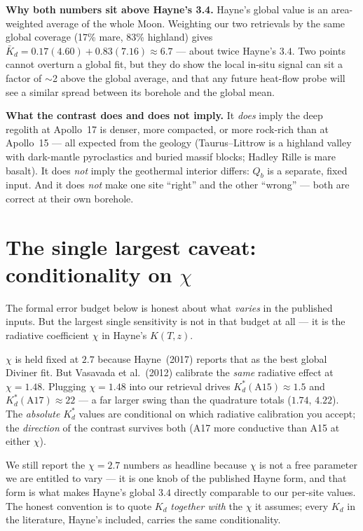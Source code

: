 \documentclass[11pt]{report}
\begin{document}
\noindent\textbf{Why both numbers sit above Hayne's 3.4.} Hayne's global value is
an area-weighted average of the whole Moon. Weighting our two retrievals by the
same global coverage (17\% mare, 83\% highland) gives
$\bar K_d=0.17(4.60)+0.83(7.16)\approx6.7$ --- about twice Hayne's $3.4$. Two
points cannot overturn a global fit, but they do show the local in-situ signal
can sit a factor of $\sim$2 above the global average, and that any future
heat-flow probe will see a similar spread between its borehole and the global
mean.

\noindent\textbf{What the contrast does and does not imply.} It \emph{does} imply
the deep regolith at Apollo~17 is denser, more compacted, or more rock-rich than
at Apollo~15 --- all expected from the geology (Taurus--Littrow is a highland
valley with dark-mantle pyroclastics and buried massif blocks; Hadley Rille is
mare basalt). It does \emph{not} imply the geothermal interior differs: $Q_b$ is
a separate, fixed input. And it does \emph{not} make one site ``right'' and the
other ``wrong'' --- both are correct at their own borehole.

\section{The single largest caveat: conditionality on $\chi$}\label{sec:chi}

The formal error budget below is honest about what \emph{varies} in the published
inputs. But the largest single sensitivity is not in that budget at all --- it is
the radiative coefficient $\chi$ in Hayne's $K(T,z)$.

\begin{warn}
$\chi$ is held fixed at $2.7$ because Hayne~(2017) reports that as the best global
Diviner fit. But Vasavada et al.~(2012) calibrate the \emph{same} radiative effect
at $\chi=1.48$. Plugging $\chi=1.48$ into our retrieval drives
$K_d^{*}(\mathrm{A15})\!\approx\!1.5$ and $K_d^{*}(\mathrm{A17})\!\approx\!22$ ---
a far larger swing than the quadrature totals ($1.74$, $4.22$). The
\emph{absolute} $K_d^{*}$ values are conditional on which radiative calibration
you accept; the \emph{direction} of the contrast survives both (A17 more
conductive than A15 at either $\chi$).
\end{warn}

\noindent We still report the $\chi=2.7$ numbers as headline because $\chi$ is
not a free parameter we are entitled to vary --- it is one knob of the published
Hayne form, and that form is what makes Hayne's global $3.4$ directly comparable
to our per-site values. The honest convention is to quote $K_d$ \emph{together
with} the $\chi$ it assumes; every $K_d$ in the literature, Hayne's included,
carries the same conditionality.
\end{document}
